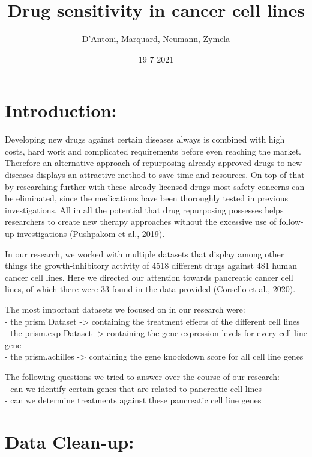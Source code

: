 \documentclass[
]{article}
\title{Drug sensitivity in cancer cell lines}
\author{D'Antoni, Marquard, Neumann, Zymela}
\date{19 7 2021}
\begin{document}
\maketitle

\hypertarget{introduction}{%
\section{Introduction:}\label{introduction}}

Developing new drugs against certain diseases always is combined with
high costs, hard work and complicated requirements before even reaching
the market. Therefore an alternative approach of repurposing already
approved drugs to new diseases displays an attractive method to save
time and resources. On top of that by researching further with these
already licensed drugs most safety concerns can be eliminated, since the
medications have been thoroughly tested in previous investigations. All
in all the potential that drug repurposing possesses helps researchers
to create new therapy approaches without the excessive use of follow-up
investigations (Pushpakom et al., 2019).

In our research, we worked with multiple datasets that display among
other things the growth-inhibitory activity of 4518 different drugs
against 481 human cancer cell lines. Here we directed our attention
towards pancreatic cancer cell lines, of which there were 33 found in
the data provided (Corsello et al., 2020).

The most important datasets we focused on in our research were:\\
- the prism Dataset -\textgreater{} containing the treatment effects of
the different cell lines\\
- the prism.exp Dataset -\textgreater{} containing the gene expression
levels for every cell line gene\\
- the prism.achilles -\textgreater{} containing the gene knockdown score
for all cell line genes

The following questions we tried to answer over the course of our
research:\\
- can we identify certain genes that are related to pancreatic cell
lines\\
- can we determine treatments against these pancreatic cell line genes

\hypertarget{data-clean-up}{%
\section{Data Clean-up:}\label{data-clean-up}}
\end{document}
